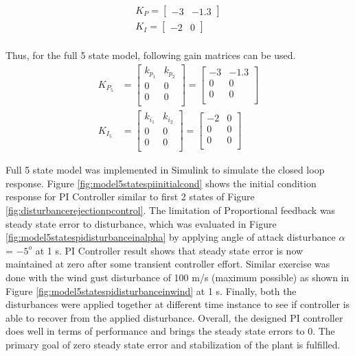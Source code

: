 \documentclass[12pt]{article}
\begin{document}
	\begin{equation}
	\begin{split}
	K_P = \begin{bmatrix} -3 & -1.3 \end{bmatrix}\\
	K_I = \begin{bmatrix} -2 & 0 \end{bmatrix}\\
	\end{split}
	\end{equation}
	
	\noindent Thus, for the full 5 state model, following gain matrices can be used. 
	\begin{equation}
	\begin{split}
	K_{P_5} &= \begin{bmatrix}
	k_{p_1} & k_{p_2} \\
	0&0\\
	0&0\\
	\end{bmatrix} = \begin{bmatrix}
	-3 & -1.3\\
	0&0\\
	0&0\\
	\end{bmatrix}\\
	K_{I_5} &= \begin{bmatrix}
	k_{i_1} & k_{i_2}\\
	0&0\\
	0&0\\
	\end{bmatrix} = \begin{bmatrix}
	-2 & 0\\
	0&0\\
	0&0\\
	\end{bmatrix}
	\end{split}
	\end{equation}
	
	\noindent Full 5 state model was implemented in Simulink to simulate the closed loop response. Figure \ref{fig:model5statespiinitialcond} shows the initial condition response for PI Controller similar to first 2 states of Figure \ref{fig:disturbancerejectionpcontrol}. The limitation of Proportional feedback was steady state error to disturbance, which was evaluated in Figure \ref{fig:model5statespidisturbanceinalpha} by applying angle of attack disturbance $\alpha$ = $-5^{o}$ at 1 s. PI Controller result shows that steady state error is now maintained at zero after some transient controller effort. Similar exercise was done with the wind gust disturbance of 100 m/s (maximum possible) as shown in Figure \ref{fig:model5statespidisturbanceinwind} at 1 s. Finally, both the disturbances were applied together at different time instance to see if controller is able to recover from the applied disturbance. Overall, the designed PI controller does well in terms of performance and brings the steady state errors to 0. The primary goal of zero steady state error and stabilization of the plant is fulfilled.
	
\end{document}
